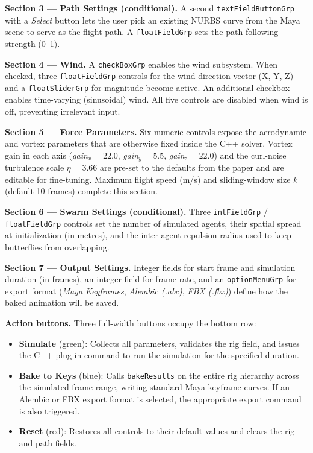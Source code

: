 \documentclass[12pt]{article}
\begin{document}
\textbf{Section 3 --- Path Settings (conditional).}
A second \texttt{textFieldButtonGrp} with a \textit{Select} button lets the user pick
an existing NURBS curve from the Maya scene to serve as the flight path. A
\texttt{floatFieldGrp} sets the path-following strength (0--1).

\textbf{Section 4 --- Wind.}
A \texttt{checkBoxGrp} enables the wind subsystem. When checked, three
\texttt{floatFieldGrp} controls for the wind direction vector (X, Y, Z) and a
\texttt{floatSliderGrp} for magnitude become active. An additional checkbox enables
time-varying (sinusoidal) wind. All five controls are disabled when wind is off,
preventing irrelevant input.

\textbf{Section 5 --- Force Parameters.}
Six numeric controls expose the aerodynamic and vortex parameters that are otherwise
fixed inside the C++ solver. Vortex gain in each axis (\textit{gain}$_x = 22.0$,
\textit{gain}$_y = 5.5$, \textit{gain}$_z = 22.0$) and the curl-noise turbulence
scale $\eta = 3.66$ are pre-set to the defaults from the paper and are editable
for fine-tuning. Maximum flight speed (m/s) and sliding-window size $k$ (default 10
frames) complete this section.

\textbf{Section 6 --- Swarm Settings (conditional).}
Three \texttt{intFieldGrp} / \texttt{floatFieldGrp} controls set the number of
simulated agents, their spatial spread at initialization (in metres), and the
inter-agent repulsion radius used to keep butterflies from overlapping.

\textbf{Section 7 --- Output Settings.}
Integer fields for start frame and simulation duration (in frames), an integer field for
frame rate, and an \texttt{optionMenuGrp} for export format
(\textit{Maya Keyframes}, \textit{Alembic (.abc)}, \textit{FBX (.fbx)}) define how the
baked animation will be saved.

\textbf{Action buttons.}
Three full-width buttons occupy the bottom row:
\begin{itemize}
  \item \textbf{Simulate} (green): Collects all parameters, validates the rig field,
    and issues the C++ plug-in command to run the simulation for the specified duration.
  \item \textbf{Bake to Keys} (blue): Calls \texttt{bakeResults} on the entire rig
    hierarchy across the simulated frame range, writing standard Maya keyframe curves.
    If an Alembic or FBX export format is selected, the appropriate export command is
    also triggered.
  \item \textbf{Reset} (red): Restores all controls to their default values and clears
    the rig and path fields.
\end{itemize}
\end{document}
